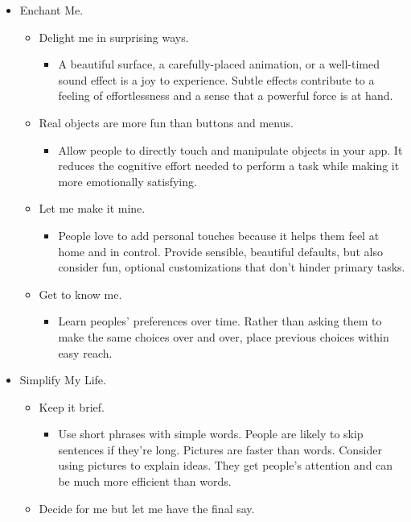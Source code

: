 \begin{itemize}
\item Enchant Me.
\begin{itemize}
\item Delight me in surprising ways.
\begin{itemize}
\item A beautiful surface, a carefully-placed animation, or a well-timed sound effect is a joy to experience. Subtle effects contribute to a feeling of effortlessness and a sense that a powerful force is at hand.
\end{itemize}
\item Real objects are more fun than buttons and menus.
\begin{itemize}
\item Allow people to directly touch and manipulate objects in your app. It reduces the cognitive effort needed to perform a task while making it more emotionally satisfying.
\end{itemize}
\item Let me make it mine.
\begin{itemize}
\item People love to add personal touches because it helps them feel at home and in control. Provide sensible, beautiful defaults, but also consider fun, optional customizations that don't hinder primary tasks.
\end{itemize}
\item Get to know me.
\begin{itemize}
\item Learn peoples' preferences over time. Rather than asking them to make the same choices over and over, place previous choices within easy reach.
\end{itemize}
\end{itemize}
\newpage
\item Simplify My Life.
\begin{itemize}
\item Keep it brief.
\begin{itemize}
\item Use short phrases with simple words. People are likely to skip sentences if they're long.
Pictures are faster than words.
Consider using pictures to explain ideas. They get people's attention and can be much more efficient than words.
\end{itemize}
\item Decide for me but let me have the final say.
\begin{itemize}

\end{itemize}
\end{itemize}
\end{itemize}
